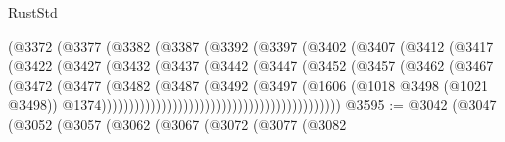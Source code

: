 \begin{lexlean}{RustStd}
\begin{coremodule}
{\begin{coremodule}
{{{{{{{{{{{{{{{{{{{{{{{{{{{{{{{{{{{{{{{{{{{{{{{{{{{{{{{{{{{{{{{{{{{{                                      (@3372
                                        (@3377
                                          (@3382
                                            (@3387
                                              (@3392
                                                (@3397
                                                  (@3402
                                                    (@3407
                                                      (@3412
                                                        (@3417
                                                          (@3422
                                                            (@3427
                                                              (@3432
                                                                (@3437
                                                                  (@3442
                                                                    (@3447
                                                                      (@3452
                                                                        (@3457
                                                                          (@3462
                                                                            (@3467
                                                                              (@3472
                                                                                (@3477
                                                                                  (@3482
                                                                                    (@3487
                                                                                      (@3492
                                                                                        (@3497
                                                                                          (@1606
                                                                                            (@1018
                                                                                              @3498
                                                                                              (@1021
                                                                                                @3498))
                                                                                            @1374))))))))))))))))))))))))))))))))))))))))))))
@3595 := @3042
    (@3047
      (@3052
        (@3057
          (@3062
            (@3067
              (@3072
                (@3077
                  (@3082
}}}}}}}}}}}}}}}}}}}}}}}}}}}}}}}}}}}}}}}}}}}}}}}}}}}}}}}}}}}}}}}}}}}}
\end{coremodule}}
\end{coremodule}
\end{lexlean}
